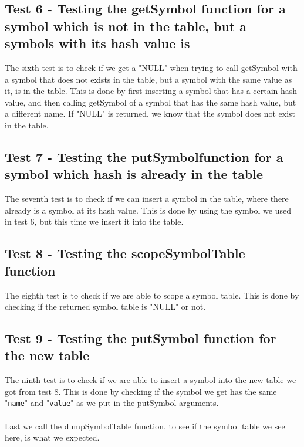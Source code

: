 \documentclass[a4paper,10pt,titlepage]{report}
\begin{document}
\subsection{Test 6 - Testing the getSymbol function for a symbol which is not in the table, but a symbols with its hash value is}
The sixth test is to check if we get a "NULL" when trying to call getSymbol with a symbol that does not exists in the table, but a symbol with the same value as it, is in the table. This is done by first inserting a symbol that has a certain hash value, and then calling getSymbol of a symbol that has the same hash value, but a different name. If "NULL" is returned, we know that the symbol does not exist in the table.

\subsection{Test 7 - Testing the putSymbolfunction for a symbol which hash is already in the table}
The seventh test is to check if we can insert a symbol in the table, where there already is a symbol at its hash value. This is done by using the symbol we used in test 6, but this time we insert it into the table.

\subsection{Test 8 - Testing the scopeSymbolTable function}
The eighth test is to check if we are able to scope a symbol table. This is done by checking if the returned symbol table is "NULL" or not.

\subsection{Test 9 - Testing the putSymbol function for the new table}
The ninth test is to check if we are able to insert a symbol into the new table we got from test 8. This is done by checking if the symbol we get has the same "\verb!name!" and "\verb!value!" as we put in the putSymbol arguments.
\\~\\
Last we call the dumpSymbolTable function, to see if the symbol table we see here, is what we expected.
\end{document}
